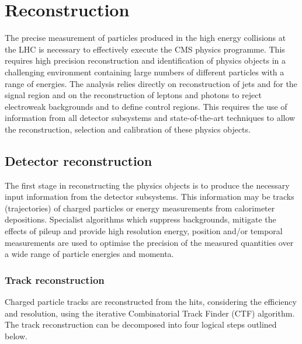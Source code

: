 \chapter{Reconstruction} %
\label{sec:reco}

The precise measurement of particles produced in the high energy collisions at the LHC 
is necessary to effectively execute the CMS physics programme. This requires high precision
reconstruction and identification of physics objects in a challenging environment containing
large numbers of different particles with a range of energies. The \alphat analysis 
relies directly on reconstruction of jets and \met for the signal region and on the 
reconstruction of leptons and photons to reject electroweak 
backgrounds and to define control regions.
This requires the use of information from all detector subsystems and state-of-the-art
techniques to allow the reconstruction, selection and calibration of these physics objects.


\section{Detector reconstruction}

The first stage in reconstructing the physics objects is to produce the necessary
input information from the detector subsystems. This information may be tracks
(trajectories) of charged particles or energy measurements from calorimeter depositions. 
Specialist algorithms which suppress backgrounds, mitigate the effects of pileup and provide high resolution energy,
position and/or temporal measurements are used to optimise the precision of the 
measured quantities over a wide range of particle energies and momenta.

\subsection{Track reconstruction}

Charged particle tracks are reconstructed from the hits, considering the efficiency and resolution, 
using the iterative Combinatorial Track Finder (CTF) algorithm. The track reconstruction can be decomposed 
into four logical steps outlined below.

